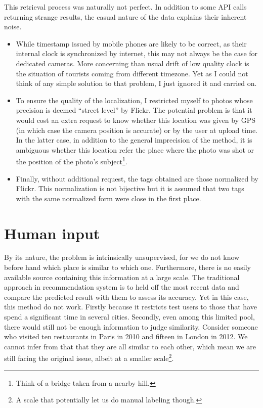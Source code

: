 This retrieval process was naturally not perfect. In addition to some API
calls returning strange results, the casual nature of the data explains their
inherent noise.

\begin{itemize}
	\item While timestamp issued by mobile phones are likely to be correct,
 as their internal clock is synchronized by internet, this may not
 always be the case for dedicated cameras. More concerning than usual
 drift of low quality clock is the situation of tourists coming from
 different timezone. Yet as I could not think of any simple solution to
 that problem, I just ignored it and carried on.
	\item To ensure the quality of the localization, I restricted myself to
 photos whose precision is deemed \enquote{street level} by Flickr. The
 potential problem is that it would cost an extra request to know
 whether this location was given by GPS (in which case the camera
 position is accurate) or by the user at upload time. In the latter
 case, in addition to the general imprecision of the method, it is
 ambiguous whether this location refer the place where the photo was
 shot or the position of the photo's subject\footnote{Think of a bridge
 taken from a nearby hill.}.
	\item Finally, without additional request, the tags obtained are those
 normalized by Flickr. This normalization is not bijective but it is
 assumed that two tags with the same normalized form were close in the
 first place.
\end{itemize}

\section{Human input}

By its nature, the problem is intrinsically unsupervised, for we do not know
before hand which place is similar to which one. Furthermore, there is no
easily available source containing this information at a large scale. The
traditional approach in recommendation system is to held off the most recent
data and compare the predicted result with them to assess its accuracy.  Yet
in this case, this method do not work. Firstly because it restricts test users
to those that have spend a significant time in several cities. Secondly, even
among this limited pool, there would still not be enough information to
judge similarity. Consider someone who visited ten restaurants in Paris in
2010 and fifteen in London in 2012. We cannot infer from that that they are
all similar to each other, which mean we are still facing the original issue,
albeit at a smaller scale\footnote{A scale that potentially let us do manual
labeling though.}.

